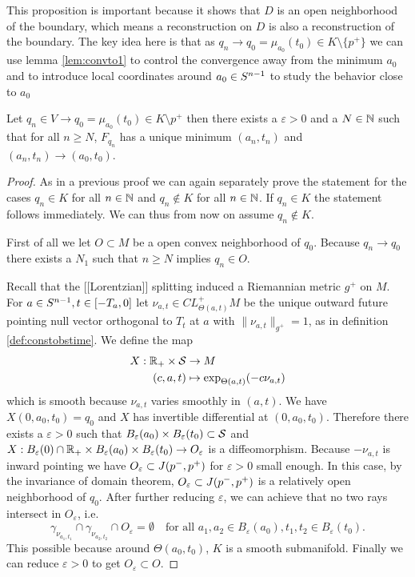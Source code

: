 This proposition is important because it shows that $D$ is an open neighborhood of the boundary, which means a reconstruction on $D$ is also a reconstruction of the boundary. The key idea here is that as $q_n \to q_0=\mu_{a_0}(t_0)\in K \setminus \{p^+\}$ we can use lemma \ref{lem:convto1} to control the convergence away from the minimum $a_0$ and to introduce local coordinates around $a_0\in {S^{n-1}}$ to study the behavior close to $a_0$
\begin{proposition}\label{prop:boundarymin}
    Let $q_n\in V\to q_0=\mu_{a_0}(t_0)\in K\setminus p^+$ then there exists a $\varepsilon>0$ and a $N\in \mathbb{N}$ such that for all $n\ge N$, $F_{q_n}$ has a unique minimum $(a_n,t_n)$ and $(a_n,t_n)\to (a_0,t_0)$.
\end{proposition}
\begin{proof}
    As in a previous proof we can again separately prove the statement for the cases $q_n\in K$ for all $n\in \mathbb{N}$ and $q_n \notin K$ for all $n\in \mathbb{N}$. If $q_n \in K$ the statement follows immediately. We can thus from now on assume $q_n \notin K$.

    First of all we let $O\subset M$ be a open convex neighborhood of $q_0$. Because $q_n \to q_0$ there exists a $N_1$ such that $n\ge N$ implies $q_n \in O$.

    Recall that the [[Lorentzian]] splitting induced a Riemannian metric $g^+$ on $M$. For $a\in {S^{n-1}}, t\in [-T_a,0]$ let $\nu_{a,t}\in CL^+_{\Theta(a,t)}M$ be the unique outward future pointing null vector orthogonal to $T_t$ at $a$ with $\lVert \nu_{a,t} \rVert_{g^+}=1$, as in definition \ref{def:constobstime}. We define the map 
    \begin{align*}
        X:\mathbb{R}_+\times {\mathcal{S}} &\to M \\
        (c,a,t)&\mapsto \exp_{\Theta(a,t)}(-c\nu_{a,t})
    \end{align*} which is smooth because $\nu_{a,t}$ varies smoothly in $(a,t)$. We have $X(0,a_0,t_0)=q_0$ and $X$ has invertible differential at $(0,a_0,t_0)$. Therefore there exists a $\varepsilon>0$ such that $B_\varepsilon(a_0) \times B_\varepsilon(t_0)\subset {\mathcal{S}}$ and $X:B_\varepsilon(0)\cap \mathbb{R}_+ \times B_\varepsilon(a_0) \times B_\varepsilon(t_0) \to O_\varepsilon$ is a diffeomorphism. Because $-\nu_{a,t}$ is inward pointing we have $O_\varepsilon\subset J(p^-,p^+)$ for $\varepsilon>0$ small enough. In this case, by the invariance of domain theorem, $O_\varepsilon\subset J(p^-,p^+)$ is a relatively open neighborhood of $q_0$. After further reducing $\varepsilon$, we can achieve that no two rays intersect in $O_\varepsilon$, i.e. 
    \[
        \gamma_{\nu_{a_1,t_1}} \cap \gamma_{\nu_{a_2,t_2}} \cap O_\varepsilon=\emptyset \quad  \text{for all } a_1,a_2\in B_\varepsilon(a_0), t_1,t_2 \in B_\varepsilon(t_0).
    \] This possible because around $\Theta(a_0,t_0)$, $K$ is a smooth submanifold.
    Finally we can reduce $\varepsilon>0$ to get $O_\varepsilon\subset O$.
    

\end{proof}

